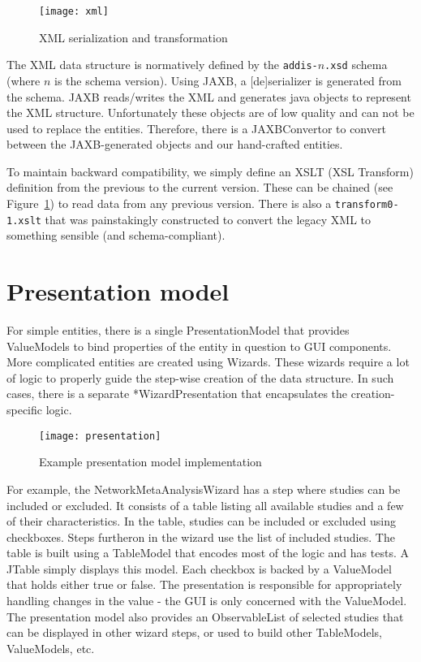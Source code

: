 \documentclass[a4paper]{article}
\begin{document}
\begin{figure}[h]
\centering
\texttt{[image: xml]}
\caption{XML serialization and transformation}
\label{fig:xml}
\end{figure}

The XML data structure is normatively defined by the {\tt addis-$n$.xsd} schema (where $n$ is the schema version).
Using JAXB, a [de]serializer is generated from the schema.
JAXB reads/writes the XML and generates java objects to represent the XML structure.
Unfortunately these objects are of low quality and can not be used to replace the entities.
Therefore, there is a JAXBConvertor to convert between the JAXB-generated objects and our hand-crafted entities.

To maintain backward compatibility, we simply define an XSLT (XSL Transform) definition from the previous to the current version.
These can be chained (see Figure~\ref{fig:xml}) to read data from any previous version.
There is also a {\tt transform0-1.xslt} that was painstakingly constructed to convert the legacy XML to something sensible (and schema-compliant).

\section{Presentation model}

For simple entities, there is a single PresentationModel that provides ValueModels to bind properties of the entity in question to GUI components.
More complicated entities are created using Wizards.
These wizards require a lot of logic to properly guide the step-wise creation of the data structure.
In such cases, there is a separate *WizardPresentation that encapsulates the creation-specific logic.

\begin{figure}[h]
\centering
\texttt{[image: presentation]}
\caption{Example presentation model implementation}
\end{figure}

For example, the NetworkMetaAnalysisWizard has a step where studies can be included or excluded.
It consists of a table listing all available studies and a few of their characteristics.
In the table, studies can be included or excluded using checkboxes.
Steps furtheron in the wizard use the list of included studies.
The table is built using a TableModel that encodes most of the logic and has tests.
A JTable simply displays this model.
Each checkbox is backed by a ValueModel that holds either true or false.
The presentation is responsible for appropriately handling changes in the value - the GUI is only concerned with the ValueModel.
The presentation model also provides an ObservableList of selected studies that can be displayed in other wizard steps, or used to build other TableModels, ValueModels, etc.
\end{document}
